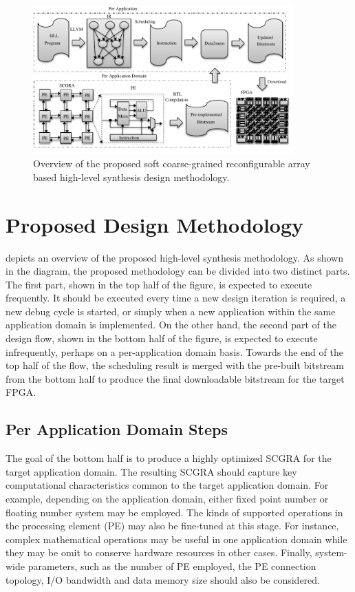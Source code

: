 \begin{figure}[!ht]
\centering
\includegraphics[width=10cm]{designflow}
\vspace{-1em}
\caption{Overview of the proposed soft coarse-grained reconfigurable array based high-level synthesis design methodology.}
\label{fig:design-methodology}
\vspace{-1em}
\end{figure}

\section{Proposed Design Methodology}\label{sec:methodology}
 depicts an overview of the proposed high-level synthesis methodology.  As shown in the diagram, the proposed methodology can be divided into two distinct parts.  The first part, shown in the top half of the figure, is expected to execute frequently.  It should be executed every time a new design iteration is required, a new debug cycle is started, or simply when a new application within the same application domain is implemented.  On the other hand, the second part of the design flow, shown in the bottom half of the figure, is expected to execute infrequently, perhaps on a per-application domain basis.  Towards the end of the top half of the flow, the scheduling result is merged with the pre-built bitstream from the bottom half to produce the final downloadable bitstream for the target FPGA.

\subsection{Per Application Domain Steps}
The goal of the bottom half is to produce a highly optimized SCGRA for the target application domain.  The resulting SCGRA should capture key computational characteristics common to the target application domain.  For example, depending on the application domain, either fixed point number or floating number system may be employed.  The kinds of supported operations in the processing element (PE) may also be fine-tuned at this stage.  For instance, complex mathematical operations may be useful in one application domain while they may be omit to conserve hardware resources in other cases.  Finally, system-wide parameters, such as the number of PE employed, the PE connection topology, I/O bandwidth and data memory size should also be considered.


